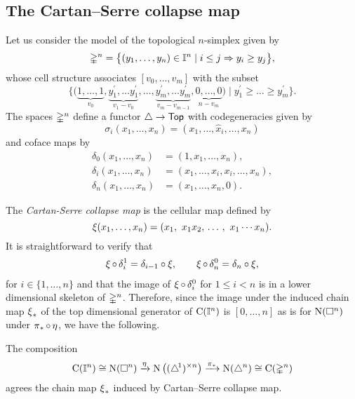 \subsection{The Cartan--Serre collapse map}

Let us consider the model of the topological $n$-simplex given by
\[
\mathbb{\Delta}^n = \big\{ (y_1, \dots, y_n) \in \mathbb{I}^n \mid i \leq j \Rightarrow y_i \geq y_j \big\},
\]
whose cell structure associates $[v_0, \dots, v_m]$ with the subset
\[
\Big\{ \big( \underbrace{1, \dots, 1}_{v_0}, \underbrace{y^\prime_1, \dots y^\prime_1}_{v_1-v_0}, \dots, \underbrace{y^\prime_m, \dots y^\prime_m}_{v_m-v_{m-1}}, \underbrace{0, \dots, 0}_{n-v_m} \big) \mid y^\prime_1 \geq \dots \geq y^\prime_m \Big\}.
\]
The spaces $\mathbb{\Delta}^n$ define a functor $\triangle \to \mathsf{Top}$ with codegeneracies given by
\[
\sigma_i(x_1, \dots, x_n) = (x_1, \dots, \widehat x_i, \dots, x_n)
\]
and coface maps by
\begin{align*}
\delta_0(x_1, \dots, x_n) &= (1, x_1, \dots, x_n), \\
\delta_i(x_1, \dots, x_n) &= (x_1, \dots, x_i, x_i, \dots, x_n), \\
\delta_n(x_1, \dots, x_n) &= (x_1, \dots, x_n, 0).
\end{align*}

The \textit{Cartan-Serre collapse map} is the cellular map defined by
\[
\operatorname{\xi}(x_1, \dots, x_n) = (x_1,\ x_1 x_2, \, \dots \, , \ x_1 \dotsm x_n).
\]
It is straightforward to verify that
\begin{align*}
\operatorname{\xi} \circ \, \delta_i^1 = \delta_{i-1} \circ \operatorname{\xi}, \qquad
\operatorname{\xi} \circ \, \delta_n^0 = \delta_n \circ \operatorname{\xi},
\end{align*}
for $i \in \{1, \dots, n\}$ and that the image of $\operatorname{\xi} \circ \, \delta_i^0$ for $1 \leq i < n$ is in a lower dimensional skeleton of $\mathbb{\Delta}^n$.
Therefore, since the image under the induced chain map $\operatorname{\xi}_\ast$ of the top dimensional generator of $\operatorname{C}(\mathbb{I}^n)$ is $[0, \dots, n]$ as is for $\operatorname{N}(\square^n)$ under $\operatorname{\pi}_\ast \circ \operatorname{\eta}$, we have the following.

\begin{lemma}
	The composition
	\[
	\operatorname{C}(\mathbb{I}^n) \cong \operatorname{N}(\square^n) \xrightarrow{\operatorname{\eta}} \operatorname{N} \big( (\triangle^{\!1})^{\times n} \big) \xrightarrow{\operatorname{\pi}_\ast} \operatorname{N}(\triangle^n) \cong \operatorname{C}(\mathbb{\Delta}^n)
	\]
	agrees the chain map $\operatorname{\xi}_\ast$ induced by Cartan--Serre collapse map.
\end{lemma}

